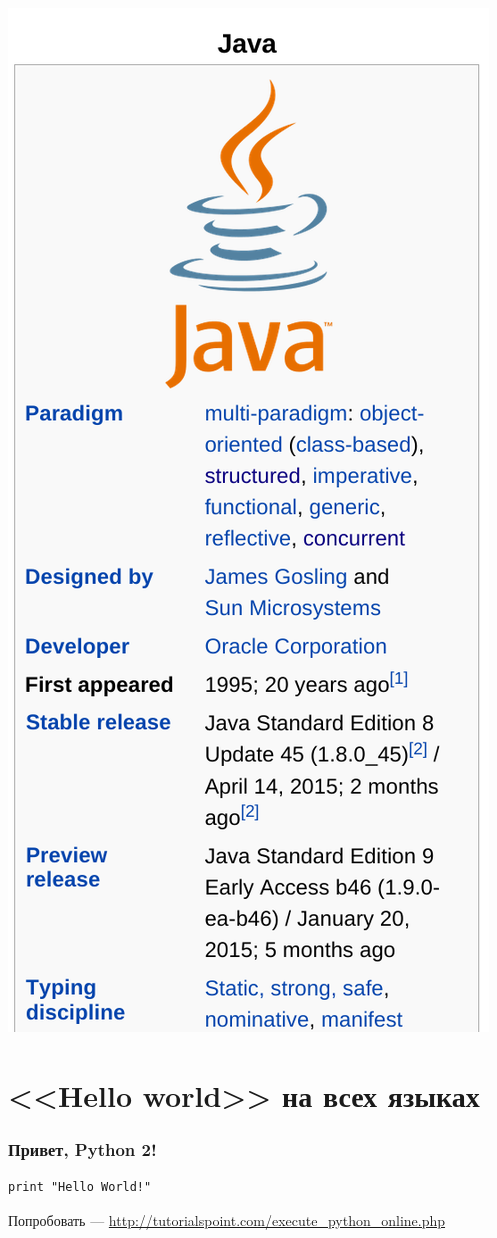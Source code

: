 {{\begin{center}
        \includegraphics[scale=0.12]{pictures/java.png}
      \end{center}
    }

  \section{<<Hello world>> на всех языках}
\begin{frame}[fragile]
  \frametitle{Привет, Python 2!}
  \begin{verbatim}
print "Hello World!"
  \end{verbatim}
  \vspace{2cm}
  Попробовать --- \url{http://tutorialspoint.com/execute\_python\_online.php}
\end{frame}

}
